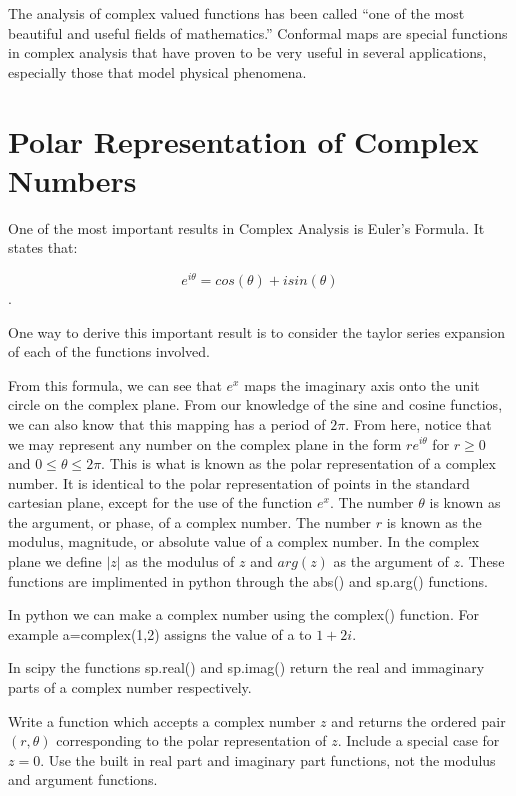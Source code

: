 

The analysis of complex valued functions has been called ``one of the most beautiful and useful fields of mathematics.''  Conformal maps are special functions in complex analysis that have proven to be very useful in several applications, especially those that model physical phenomena.

\section*{Polar Representation of Complex Numbers}

One of the most important results in Complex Analysis is Euler's Formula. It states that: 

$$e^{i\theta}=cos(\theta)+i sin(\theta)$$.

One way to derive this important result is to consider the taylor series expansion of each of the functions involved. 

From this formula, we can see that $e^x$ maps the imaginary axis onto the unit circle on the complex plane. From our knowledge of the sine and cosine functios, we can also know that this mapping has a period of $2\pi$. From here, notice that we may represent any number on the complex plane in the form $r e^{i\theta}$ for $r\geq 0$ and $0 \leq \theta \leq 2\pi$. This is what is known as the polar representation of a complex number. It is identical to the polar representation of points in the standard cartesian plane, except for the use of the function $e^x$. The number $\theta$ is known as the argument, or phase, of a complex number. The number $r$ is known as the modulus, magnitude, or absolute value of a complex number. In the complex plane we define $|z|$ as the modulus of $z$ and $arg(z)$ as the argument of $z$. These functions are implimented in python through the abs() and sp.arg() functions. 

In python we can make a complex number using the complex() function. For example a=complex(1,2) assigns the value of a to $1+2i$.

In scipy the functions sp.real() and sp.imag() return the real and immaginary parts of a complex number respectively. 


\begin{problem}
Write a function which accepts a complex number $z$ and returns the ordered pair $(r,\theta)$ corresponding to the polar representation of $z$. Include a special case for $z=0$. Use the built in real part and imaginary part functions, not the modulus and argument functions. 
\end{problem}

